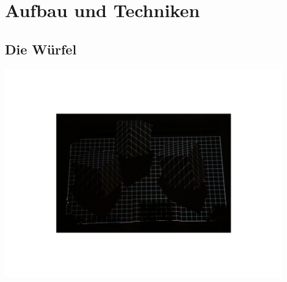 \documentclass[pdftex,12pt,a4paper]{report}
\begin{document}
\newpage

\section{Aufbau und Techniken}

\subsection{Die Würfel}

\includegraphics[width=0.9\textwidth]{./wuerfel_beamer}\\[0.3cm]   
\end{document}
